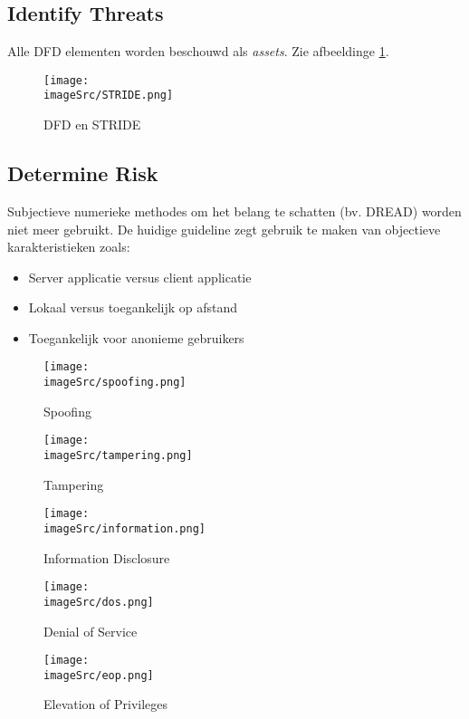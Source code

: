 \documentclass[../main.tex]{subfiles}
\begin{document}
\subsection{Identify Threats}
Alle DFD elementen worden beschouwd als \textit{assets}. Zie afbeeldinge \ref{STRIDE}.
\begin{figure}[h!]
    \centering
    \texttt{[image: \\imageSrc/STRIDE.png]}
    \label{STRIDE}
    \caption{DFD en STRIDE}
\end{figure}
\subsection{Determine Risk}
Subjectieve numerieke methodes om het belang te schatten (bv. DREAD) worden niet meer gebruikt. De huidige guideline zegt gebruik te maken van objectieve karakteristieken zoals:
\begin{itemize}
	\item Server applicatie versus client applicatie
	\item Lokaal versus toegankelijk op afstand
	\item Toegankelijk voor anonieme gebruikers
\end{itemize}

\begin{figure}[h!]
    \centering
    \texttt{[image: \\imageSrc/spoofing.png]}
    \caption{Spoofing}
    \label{spoofing}
\end{figure}

\begin{figure}[h!]
    \centering
    \texttt{[image: \\imageSrc/tampering.png]}
    \caption{Tampering}
    \label{tampering}
\end{figure}
    
\begin{figure}[h!]
    \centering
    \texttt{[image: \\imageSrc/information.png]}
    \caption{Information Disclosure}
    \label{information}
\end{figure}
    
\begin{figure}[h!]
    \centering
    \texttt{[image: \\imageSrc/dos.png]}
    \caption{Denial of Service}
    \label{dos}
\end{figure}
    
\begin{figure}[h!]
    \centering
    \texttt{[image: \\imageSrc/eop.png]}
    \caption{Elevation of Privileges}
    \label{eop}
\end{figure}
\end{document}
